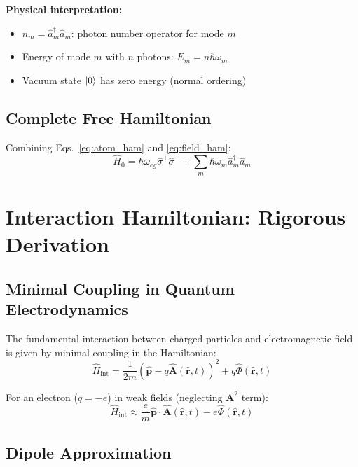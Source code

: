 \documentclass[12pt,a4paper]{article}
\begin{document}
\textbf{Physical interpretation:}
\begin{itemize}[leftmargin=*]
\item $\hat{n}_m = \hat{a}_m^\dagger \hat{a}_m$: photon number operator for mode $m$
\item Energy of mode $m$ with $n$ photons: $E_m = n\hbar\omega_m$
\item Vacuum state $\ket{0}$ has zero energy (normal ordering)
\end{itemize}

\subsection{Complete Free Hamiltonian}

Combining Eqs.~\eqref{eq:atom_ham} and \eqref{eq:field_ham}:
\begin{equation}
\hat{H}_0 = \hbar\omega_{eg} \hat{\sigma}^+ \hat{\sigma}^- + \sum_m \hbar\omega_m \hat{a}_m^\dagger \hat{a}_m \label{eq:H0_complete}
\end{equation}

\section{Interaction Hamiltonian: Rigorous Derivation}

\subsection{Minimal Coupling in Quantum Electrodynamics}

The fundamental interaction between charged particles and electromagnetic field is given by minimal coupling in the Hamiltonian:
\begin{equation}
\hat{H}_{\text{int}} = \frac{1}{2m}\left(\hat{\mathbf{p}} - q\hat{\mathbf{A}}(\hat{\mathbf{r}}, t)\right)^2 + q\hat{\Phi}(\hat{\mathbf{r}}, t) \label{eq:minimal_coupling}
\end{equation}

For an electron ($q = -e$) in weak fields (neglecting $\mathbf{A}^2$ term):
\begin{equation}
\hat{H}_{\text{int}} \approx \frac{e}{m}\hat{\mathbf{p}} \cdot \hat{\mathbf{A}}(\hat{\mathbf{r}}, t) - e\hat{\Phi}(\hat{\mathbf{r}}, t)
\end{equation}

\subsection{Dipole Approximation}
\end{document}
